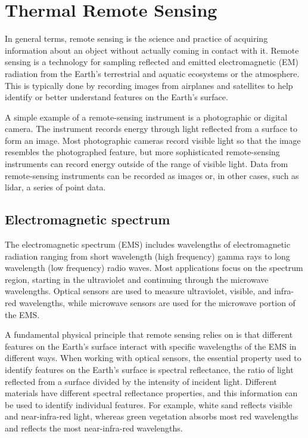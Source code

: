 \newpage

    
\section{Thermal Remote Sensing} \label{sec:thermal_remote_sensing}

In general terms, remote sensing is the science and practice of acquiring information about an object without actually coming in contact with it.
Remote sensing is a technology for sampling reflected and emitted electromagnetic (EM) radiation from the Earth's terrestrial and aquatic ecosystems or the atmosphere.
This is typically done by recording images from airplanes and satellites to help identify or better understand features on the Earth's surface.

A simple example of a remote-sensing instrument is a photographic or digital camera.
The instrument records energy through light reflected from a surface to form an image.
Most photographic cameras record visible light so that the image resembles the photographed feature, but more sophisticated remote-sensing instruments can record energy outside of the range of visible light.
Data from remote-sensing instruments can be recorded as images or, in other cases, such as lidar, a series of point data.

    \subsection{Electromagnetic spectrum}

    The electromagnetic spectrum (EMS) includes wavelengths of electromagnetic radiation ranging from short wavelength (high frequency) gamma rays to long wavelength (low frequency) radio waves. 
    Most applications focus on the spectrum region, starting in the ultraviolet and continuing through the microwave wavelengths. 
    Optical sensors are used to measure ultraviolet, visible, and infra-red wavelengths, while microwave sensors are used for the microwave portion of the EMS.
    
    A fundamental physical principle that remote sensing relies on is that different features on the Earth's surface interact with specific wavelengths of the EMS in different ways.
    When working with optical sensors, the essential property used to identify features on the Earth's surface is spectral reflectance, the ratio of light reflected from a surface divided by the intensity of incident light.
    Different materials have different spectral reflectance properties, and this information can be used to identify individual features.
    For example, white sand reflects visible and near-infra-red light, whereas green vegetation absorbs most red wavelengths and reflects the most near-infra-red wavelengths.    

